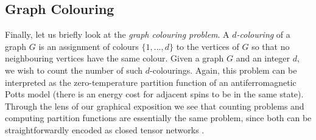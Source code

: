 





\subsection{Graph Colouring}


Finally, let us briefly look at the \emph{graph colouring problem}. A \emph{$d$-colouring} of a graph $G$ is an assignment of colours $\{1, ..., d\}$ to the vertices of $G$ so that no neighbouring vertices have the same colour. Given a graph $G$ and an integer $d$, we wish to count the number of such $d$-colourings. Again, this problem can be interpreted as the zero-temperature
partition function of an antiferromagnetic Potts model (there is an energy cost for adjacent spins to be in the same state).
Through the lens of our graphical exposition we see that counting problems and computing partition functions are essentially the same problem, since both can be straightforwardly encoded as closed tensor networks \cite{10.21468/SciPostPhys.7.5.060,debeaudrap2020tensor}.

